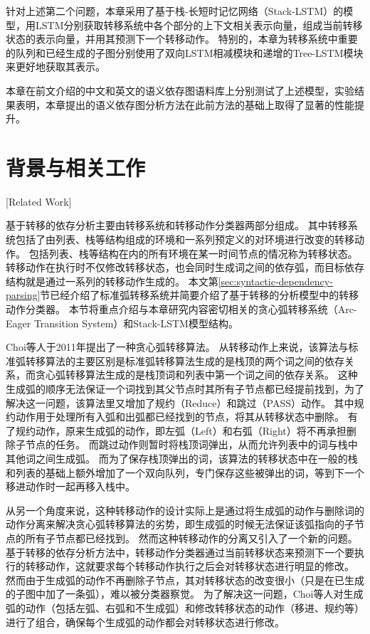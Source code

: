 针对上述第二个问题，本章采用了基于栈-长短时记忆网络（Stack-LSTM）的模型，用LSTM分别获取转移系统中各个部分的上下文相关表示向量，组成当前转移状态的表示向量，并用其预测下一个转移动作。
特别的，本章为转移系统中重要的队列和已经生成的子图分别使用了双向LSTM相减模块和递增的Tree-LSTM模块来更好地获取其表示。

本章在前文介绍的中文和英文的语义依存图语料库上分别测试了上述模型，实验结果表明，本章提出的语义依存图分析方法在此前方法的基础上取得了显著的性能提升。

\section{背景与相关工作}[Related Work]
\label{sec:chapter2-related-work}

基于转移的依存分析主要由转移系统和转移动作分类器两部分组成。
其中转移系统包括了由列表、栈等结构组成的环境和一系列预定义的对环境进行改变的转移动作。
包括列表、栈等结构在内的所有环境在某一时间节点的情况称为转移状态。
转移动作在执行时不仅修改转移状态，也会同时生成词之间的依存弧，而目标依存结构就是通过一系列的转移动作生成的。
本文第\ref{sec:syntactic-dependency-parsing}节已经介绍了标准弧转移系统并简要介绍了基于转移的分析模型中的转移动作分类器。
本节将重点介绍与本章研究内容密切相关的贪心弧转移系统（Arc-Eager Transition System）\cite{choi-palmer-2011-getting,choi-mccallum-2013-transition}和Stack-LSTM模型结构\cite{dyer-etal-2015-transition}。

Choi等人\cite{choi-palmer-2011-getting}于2011年提出了一种贪心弧转移算法。
从转移动作上来说，该算法与标准弧转移算法的主要区别是标准弧转移算法生成的是栈顶的两个词之间的依存关系，而贪心弧转移算法生成的是栈顶词和列表中第一个词之间的依存关系。
这种生成弧的顺序无法保证一个词找到其父节点时其所有子节点都已经提前找到，为了解决这一问题，该算法里又增加了规约（Reduce）和跳过（PASS）动作。
其中规约动作用于处理所有入弧和出弧都已经找到的节点，将其从转移状态中删除。
有了规约动作，原来生成弧的动作，即左弧（Left）和右弧（Right）将不再承担删除子节点的任务。
而跳过动作则暂时将栈顶词弹出，从而允许列表中的词与栈中其他词之间生成弧。
而为了保存栈顶弹出的词，该算法的转移状态中在一般的栈和列表的基础上额外增加了一个双向队列，专门保存这些被弹出的词，等到下一个移进动作时一起再移入栈中。

从另一个角度来说，这种转移动作的设计实际上是通过将生成弧的动作与删除词的动作分离来解决贪心弧转移算法的劣势，即生成弧的时候无法保证该弧指向的子节点的所有子节点都已经找到。
然而这种转移动作的分离又引入了一个新的问题。
基于转移的依存分析方法中，转移动作分类器通过当前转移状态来预测下一个要执行的转移动作，这就要求每个转移动作执行之后会对转移状态进行明显的修改。
然而由于生成弧的动作不再删除子节点，其对转移状态的改变很小（只是在已生成的子图中加了一条弧），难以被分类器察觉。
为了解决这一问题，Choi等人对生成弧的动作（包括左弧、右弧和不生成弧）和修改转移状态的动作（移进、规约等）进行了组合，确保每个生成弧的动作都会对转移状态进行修改。

